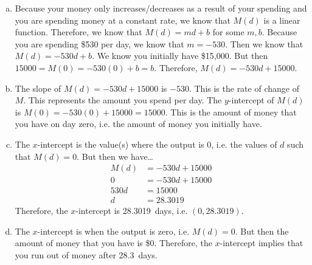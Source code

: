\documentclass[11pt,letterpaper]{article}
\begin{document}
\sol 
\begin{enumerate}[(a)]
\item Because your money only increases/decreases as a result of your spending and you are spending money at a constant rate, we know that $M(d)$ is a linear function. Therefore, we know that $M(d)= md + b$ for some $m, b$. Because you are spending \$530 per day, we know that $m= -530$. Then we know that $M(d)= -530d + b$. We know you initially have \$15,000. But then $15000= M(0)= -530(0) + b= b$. Therefore, $M(d)= -530d + 15000$. \pspace

\item The slope of $M(d)= -530d + 15000$ is $-530$. This is the rate of change of $M$. This represents the amount you spend per day. The $y$-intercept of $M(d)$ is $M(0)= -530(0) + 15000= 15000$. This is the amount of money that you have on day zero, i.e. the amount of money you initially have. \pspace

\item The $x$-intercept is the value(s) where the output is 0, i.e. the values of $d$ such that $M(d)= 0$. But then we have\dots
	\[
	\begin{aligned}
	M(d)&= -530d + 15000 \\[0.3cm]
	0&= -530d + 15000 \\[0.3cm]
	530d&= 15000 \\[0.3cm]
	d&= 28.3019
	\end{aligned}
	\]
Therefore, the $x$-intercept is 28.3019~days, i.e. $(0, 28.3019)$. \pspace

\item The $x$-intercept is when the output is zero, i.e. $M(d)= 0$. But then the amount of money that you have is \$0. Therefore, the $x$-intercept implies that you run out of money after 28.3~days. 
\end{enumerate}
\end{document}
